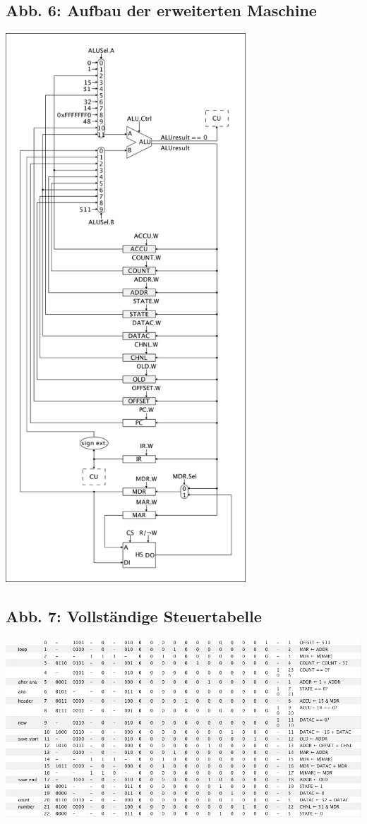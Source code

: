 \documentclass[12pt,titlepage]{article}
\begin{document}
\subsection{Abb. 6: Aufbau der erweiterten Maschine}
\includegraphics[width=9cm]{schematics_added.png}

\subsection{Abb. 7: Vollständige Steuertabelle}
\includegraphics[width=18cm]{signal_table.png}
\end{document}
